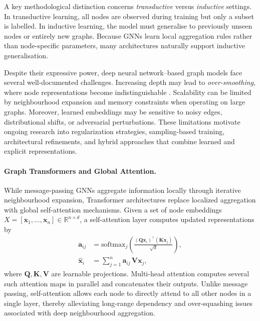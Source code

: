 A key methodological distinction concerns \emph{transductive} versus \emph{inductive} settings. In transductive learning, all nodes are observed during training but only a subset is labelled. In inductive learning, the model must generalise to previously unseen nodes or entirely new graphs. Because GNNs learn local aggregation rules rather than node-specific parameters, many architectures naturally support inductive generalisation.



Despite their expressive power, deep neural network–based graph models face several well-documented challenges. Increasing depth may lead to \emph{over-smoothing}, where node representations become indistinguishable \citep{oono2019graph}. Scalability can be limited by neighbourhood expansion and memory constraints when operating on large graphs. Moreover, learned embeddings may be sensitive to noisy edges, distributional shifts, or adversarial perturbations. 
These limitations motivate ongoing research into regularization strategies, sampling-based training, architectural refinements, and hybrid approaches that combine learned and explicit representations.
\paragraph{Graph Transformers and Global Attention.}
While message-passing GNNs aggregate information locally through iterative
neighbourhood expansion, Transformer architectures replace localized aggregation
with global self-attention mechanisms.
Given a set of node embeddings
$X = [\mathbf{x}_1,\dots,\mathbf{x}_n] \in \mathbb{R}^{n\times d}$,
a self-attention layer computes updated representations by
\begin{align}
\mathbf{a}_{ij}
&=
\mathrm{softmax}_j\!\left(
\frac{(\mathbf{Q}\mathbf{x}_i)^\top (\mathbf{K}\mathbf{x}_j)}
{\sqrt{d}}
\right),
\\
\hat{\mathbf{x}}_i
&=
\sum_{j=1}^{n}
\mathbf{a}_{ij}\, \mathbf{V}\mathbf{x}_j,
\end{align}
where $\mathbf{Q},\mathbf{K},\mathbf{V}$ are learnable projections.
Multi-head attention computes several such attention maps in parallel and
concatenates their outputs.
Unlike message passing, self-attention allows each node to directly attend to
all other nodes in a single layer, thereby alleviating long-range dependency
and over-squashing issues associated with deep neighbourhood aggregation.

